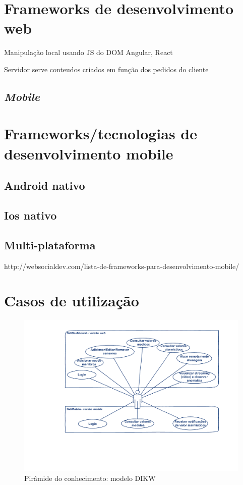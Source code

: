 \section{Frameworks de desenvolvimento web}


Manipulação local usando JS do DOM
Angular, React

Servidor serve conteudos criados em função dos pedidos do cliente 




\subsection{\textit{Mobile}}

\section{Frameworks/tecnologias de desenvolvimento mobile}



\subsection{Android nativo}

\subsection{Ios nativo}

\subsection{Multi-plataforma}

http://websocialdev.com/lista-de-frameworks-para-desenvolvimento-mobile/




\section{Casos de utilização}

\begin{figure}[!htb]
	\centering
	\includegraphics[scale=0.5]{esquemas/usecases.pdf}
	\caption{Pirâmide do conhecimento: modelo DIKW}
	\label{dikw}
\end{figure}



